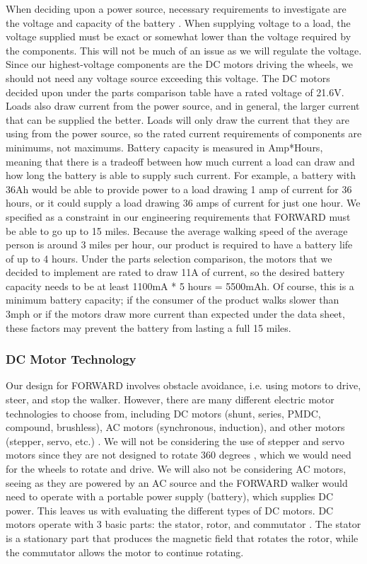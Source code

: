 \noindent When deciding upon a power source, necessary requirements to investigate are the voltage and capacity of the battery \cite{INeedMotors}. When supplying voltage to a load, the voltage supplied must be exact or somewhat lower than the voltage required by the components. This will not be much of an issue as we will regulate the voltage. Since our highest-voltage components are the DC motors driving the wheels, we should not need any voltage source exceeding this voltage. The DC motors decided upon under the parts comparison table have a rated voltage of 21.6V. Loads also draw current from the power source, and in general, the larger current that can be supplied the better. Loads will only draw the current that they are using from the power source, so the rated current requirements of components are minimums, not maximums. Battery capacity is measured in Amp*Hours, meaning that there is a tradeoff between how much current a load can draw and how long the battery is able to supply such current. For example, a battery with 36Ah would be able to provide power to a load drawing 1 amp of current for 36 hours, or it could supply a load drawing 36 amps of current for just one hour. We specified as a constraint in our engineering requirements that FORWARD must be able to go up to 15 miles. Because the average walking speed of the average person is around 3 miles per hour, our product is required to have a battery life of up to 4 hours. Under the parts selection comparison, the motors that we decided to implement are rated to draw 11A of current, so the desired battery capacity needs to be at least 1100mA * 5 hours = 5500mAh. Of course, this is a minimum battery capacity; if the consumer of the product walks slower than 3mph or if the motors draw more current than expected under the data sheet, these factors may prevent the battery from lasting a full 15 miles. \\

\subsubsection{DC Motor Technology}
\noindent Our design for FORWARD involves obstacle avoidance, i.e. using motors to drive, steer, and stop the walker. However, there are many different electric motor technologies to choose from, including DC motors (shunt, series, PMDC, compound, brushless), AC motors (synchronous, induction), and other motors (stepper, servo, etc.) \cite{elprocus1}. We will not be considering the use of stepper and servo motors since they are not designed to rotate 360 degrees \cite{pihut}, which we would need for the wheels to rotate and drive. We will also not be considering AC motors, seeing as they are powered by an AC source \cite{powerelectric} and the FORWARD walker would need to operate with a portable power supply (battery), which supplies DC power. This leaves us with evaluating the different types of DC motors. DC motors operate with 3 basic parts: the stator, rotor, and commutator \cite{elprocus2}. The stator is a stationary part that produces the magnetic field that rotates the rotor, while the commutator allows the motor to continue rotating. \\

